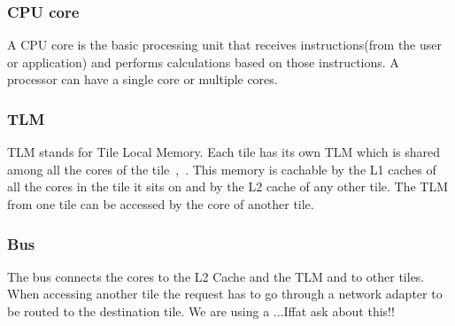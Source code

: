 \documentclass{listhesis}
\begin{document}
\subsubsection{CPU core}
A CPU core is the basic processing unit that receives instructions(from the user or application) and performs calculations based on those instructions. A processor can have a single core or multiple cores.  
\subsubsection{TLM}
TLM stands for Tile Local Memory. Each tile has its own TLM which is shared among all the cores of the tile~\cite{ankitThesis},~\cite{iNetworkAdapter}. This memory is cachable by the L1 caches of all the cores in the tile it sits on and by the L2 cache of any other tile. The TLM from one tile can be accessed by the core of another tile.\\
\subsubsection{Bus}
The bus connects the cores to the L2 Cache and the TLM and to other tiles. When accessing another tile the request has to go through a network adapter to be routed to the destination tile. We are using a ...Iffat ask about this!!
\end{document}
